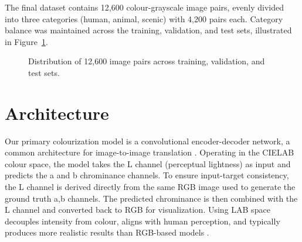 \documentclass{article} %
\begin{document}
The final dataset contains 12{,}600 colour-grayscale image pairs, evenly divided into three categories (human, animal, scenic) with 4{,}200 pairs each. Category balance was maintained 
across the training, validation, and test sets, illustrated in Figure~\ref{fig:data_split}. 

\begin{figure}[h]
\centering
{}
\caption{Distribution of 12{,}600 image pairs across training, validation, and test sets.}
\label{fig:data_split}
\end{figure}

\section{Architecture}

Our primary colourization model is a convolutional encoder-decoder network, a common architecture for image-to-image translation \citep{leatvanich2025image}. Operating in the CIELAB colour 
space, the model takes the L channel (perceptual lightness) as input and predicts the a and b chrominance channels. To ensure input-target consistency, the L channel is derived directly 
from the same RGB image used to generate the ground truth a,b channels. The predicted chrominance is then combined with the L channel and converted back to RGB for visualization. Using 
LAB space decouples intensity from colour, aligns with human perception, and typically produces more realistic results than RGB-based models \citep{leatvanich2025image}.
\end{document}
